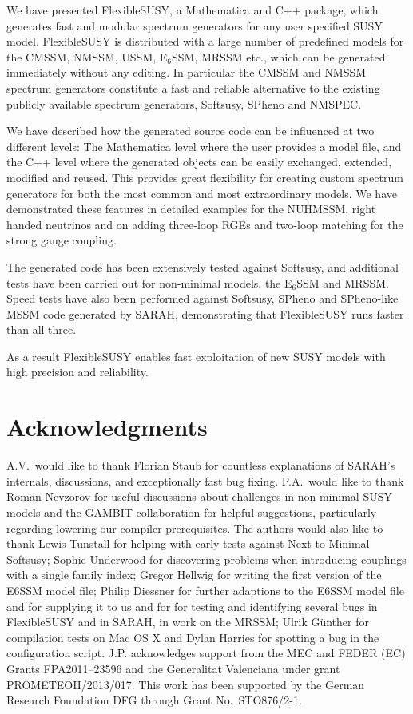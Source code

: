 \documentclass[final,3p,11pt,pdflatex]{elsarticle}
\makeatletter
\newcommand{\fs}{FlexibleSUSY\@\xspace}
\newcommand{\mathematica}{Mathematica\xspace}
\newcommand{\ESSM}{E$_6$SSM\@\xspace}
\makeatother
\begin{document}
We have presented \fs, a Mathematica and C++ package, which generates fast and
modular spectrum generators for any user specified SUSY model.  \fs is
distributed with a large number of predefined models for the CMSSM,
NMSSM, USSM, \ESSM, MRSSM etc., which can be generated immediately
without any editing.  In particular the CMSSM and NMSSM spectrum
generators constitute a fast and reliable alternative to the existing
publicly available spectrum generators, Softsusy, SPheno and
NMSPEC. 

We have described how the generated source code can be influenced at
two different levels: The \mathematica level where the user provides a
model file, and the C++ level where the generated objects can be
easily exchanged, extended, modified and reused.  This provides great
flexibility for creating custom spectrum generators for both the most
common and most extraordinary models.  We have demonstrated these
features in detailed examples for the NUHMSSM, right handed neutrinos
and on adding three-loop RGEs and two-loop matching for the strong
gauge coupling.  

The generated code has been extensively tested against Softsusy, and
additional tests have been carried out for non-minimal models, the
\ESSM and MRSSM.  Speed tests have also been performed against
Softsusy, SPheno and SPheno-like MSSM code generated by SARAH,
demonstrating that \fs runs faster than all three.

As a result \fs enables fast exploitation of new SUSY models with high
precision and reliability.

\section*{Acknowledgments}

A.V.\ would like to thank Florian Staub for countless explanations of
SARAH's internals, discussions, and exceptionally fast bug
fixing. P.A.~would like to thank Roman Nevzorov for useful discussions
about challenges in non-minimal SUSY models and the GAMBIT
collaboration for helpful suggestions, particularly regarding
lowering our compiler prerequisites. The authors would also like to
thank Lewis Tunstall for helping with early tests against
Next-to-Minimal Softsusy; Sophie Underwood for discovering problems
when introducing couplings with a single family index; Gregor Hellwig
for writing the first version of the E6SSM model file; Philip Diessner
for further adaptions to the E6SSM model file and for supplying it to
us and for for testing and identifying several bugs in \fs and in
SARAH, in work on the MRSSM; Ulrik Günther for compilation tests on
Mac OS X and Dylan Harries for spotting a bug in the configuration
script.
%
J.P. acknowledges support from the MEC and FEDER (EC) Grants
FPA2011--23596 and the Generalitat Valenciana under grant PROMETEOII/2013/017.
This work has been supported by the German Research Foundation DFG
through Grant No.~STO876/2-1.
\end{document}
